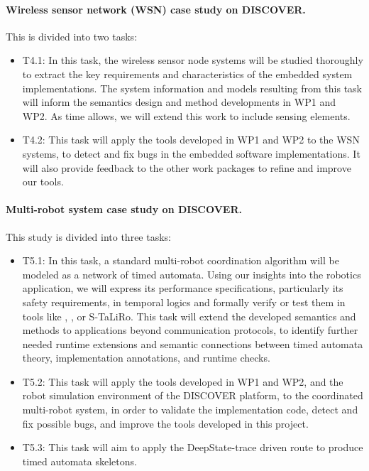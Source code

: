 \paragraph{Wireless sensor network (WSN) case study on DISCOVER.} This %
is divided into two tasks:
\noindent  \begin{itemize}[labelsep=3pt,leftmargin=12pt]
\item T4.1: In this task, the %
  wireless sensor node systems will be studied thoroughly to extract the key requirements and characteristics of the embedded system implementations.
  The system information and models resulting from this task will inform the semantics design and method developments in WP1 and WP2.  As time allows, we will extend this work to include sensing
  elements.
\item T4.2: This task will apply the tools developed in WP1 and WP2 to the WSN systems, %
  to detect and fix bugs in
  the embedded software implementations. %
  It will also provide feedback to the other work packages to refine and improve our tools.
  \end{itemize}

\paragraph {Multi-robot system case study on DISCOVER.} This study is divided into three tasks:
\noindent \begin{itemize}[labelsep=3pt,leftmargin=12pt]
\item T5.1: In this task, a standard multi-robot coordination
  algorithm %
  will be modeled as a network of timed automata.  Using our insights
  into the robotics application, we will express its performance
  specifications, particularly its safety requirements, in temporal
  logics and formally verify or test them in tools like \uppaal,
  \prism, or S-TaLiRo.  This task will extend the developed semantics
  and methods to applications beyond communication protocols, to
  identify further needed runtime extensions and semantic connections
  between timed automata theory, implementation annotations, and
  runtime checks.
\item T5.2: This task will apply the tools developed in WP1 and WP2,
  and the robot simulation environment of the DISCOVER platform, to
  the coordinated multi-robot system, in order to validate the
  implementation code, detect and fix possible bugs, and improve
  the tools developed in this project.
\item T5.3: This task will aim to apply the DeepState-trace driven
  route to produce timed automata skeletons.
  \end{itemize}

